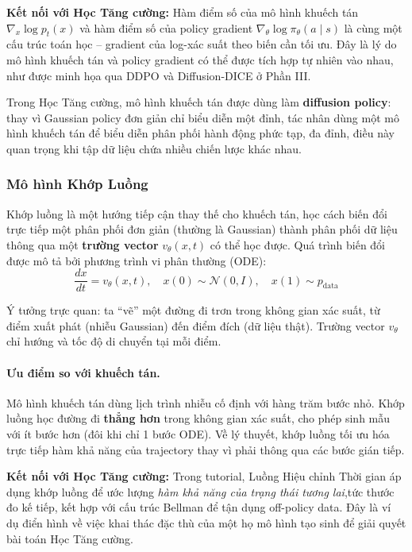 \textbf{Kết nối với Học Tăng cường:} Hàm điểm số của mô hình khuếch tán
$\nabla_x \log p_t(x)$ và hàm điểm số của policy gradient
$\nabla_\theta \log \pi_\theta(a \mid s)$ là cùng một cấu trúc toán
học -- gradient của log-xác suất theo biến cần tối ưu. Đây là lý
do mô hình khuếch tán và policy gradient có thể được tích hợp tự nhiên
vào nhau, như được minh họa qua DDPO và Diffusion-DICE ở Phần III.

Trong Học Tăng cường, mô hình khuếch tán được dùng làm \textbf{diffusion policy}:
thay vì Gaussian policy đơn giản chỉ biểu diễn một đỉnh, tác nhân dùng
một mô hình khuếch tán để biểu diễn phân phối hành động phức tạp, đa
đỉnh, điều này quan trọng khi tập dữ liệu chứa nhiều chiến lược khác nhau.

\subsubsection{Mô hình Khớp Luồng}
 
Khớp luồng là một hướng tiếp cận thay thế cho khuếch tán, học cách
biến đổi trực tiếp một phân phối đơn giản (thường là Gaussian) thành
phân phối dữ liệu thông qua một \textbf{trường vector} $v_\theta(x, t)$
có thể học được. Quá trình biến đổi được mô tả bởi phương trình vi
phân thường (ODE):
\begin{equation}
    \frac{dx}{dt} = v_\theta(x, t), \quad x(0) \sim \mathcal{N}(0, I),
    \quad x(1) \sim p_{\text{data}}
    \label{eq:flow_ode}
\end{equation}

Ý tưởng trực quan: ta ``vẽ'' một đường đi trơn trong không gian xác
suất, từ điểm xuất phát (nhiễu Gaussian) đến điểm đích (dữ liệu thật).
Trường vector $v_\theta$ chỉ hướng và tốc độ di chuyển tại mỗi điểm.

\paragraph{Ưu điểm so với khuếch tán.}

Mô hình khuếch tán dùng lịch trình nhiễu cố định với hàng trăm bước nhỏ.
Khớp luồng học đường đi \textbf{thẳng hơn} trong không gian xác
suất, cho phép sinh mẫu với ít bước hơn (đôi khi chỉ 1 bước ODE).
Về lý thuyết, khớp luồng tối ưu hóa trực tiếp hàm khả năng của
trajectory thay vì phải thông qua các bước gián tiếp.

\textbf{Kết nối với Học Tăng cường:} Trong tutorial, Luồng Hiệu chỉnh Thời gian
\cite{farebrother2025tdflows} áp dụng khớp luồng để ước lượng
\textit{hàm khả năng của trạng thái tương lai},tức thước đo kế tiếp, kết hợp với cấu trúc Bellman để tận dụng off-policy data. Đây
là ví dụ điển hình về việc khai thác đặc thù của một họ mô hình tạo sinh
để giải quyết bài toán Học Tăng cường.
 

